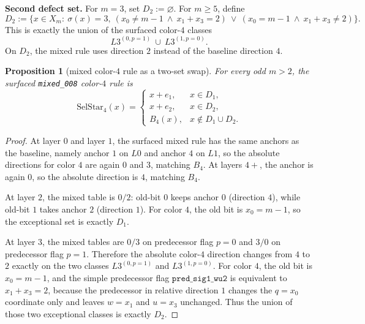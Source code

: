 \documentclass[11pt]{article}
\newtheorem{proposition}[theorem]{Proposition}
\begin{document}
\medskip
\noindent\textbf{Second defect set.}
For \(m=3\), set \(D_2:=\varnothing\).
For \(m\ge 5\), define
\[
D_2:=\bigl\{x\in X_m:\ \sigma(x)=3,\ 
(x_0\neq m-1\ \wedge\ x_1+x_3=2)\ \vee\
(x_0=m-1\ \wedge\ x_1+x_3\neq 2)\bigr\}.
\]
This is exactly the union of the surfaced color-\(4\) classes
\[
L3^{(0,p=1)}\ \cup\ L3^{(1,p=0)}.
\]
On \(D_2\), the mixed rule uses direction \(2\) instead of the baseline
direction \(4\).

\begin{proposition}[mixed color-\(4\) rule as a two-set swap]
\label{prop:mixed-color4}
For every odd \(m>2\), the surfaced \texttt{mixed\_008} color-\(4\) rule is
\[
\mathrm{SelStar}_4(x)=
\begin{cases}
x+e_1, & x\in D_1,\\
x+e_2, & x\in D_2,\\
B_4(x), & x\notin D_1\cup D_2.
\end{cases}
\]
\end{proposition}

\begin{proof}
At layer \(0\) and layer \(1\), the surfaced mixed rule has the same anchors as
the baseline, namely anchor \(1\) on \(L0\) and anchor \(4\) on \(L1\), so the
absolute directions for color \(4\) are again \(0\) and \(3\), matching \(B_4\).
At layers \(4+\), the anchor is again \(0\), so the absolute direction is \(4\),
matching \(B_4\).

At layer \(2\), the mixed table is \(0/2\): old-bit \(0\) keeps anchor \(0\)
(direction \(4\)), while old-bit \(1\) takes anchor \(2\) (direction \(1\)).
For color \(4\), the old bit is \(x_0=m-1\), so the exceptional set is exactly
\(D_1\).

At layer \(3\), the mixed tables are \(0/3\) on predecessor flag \(p=0\) and
\(3/0\) on predecessor flag \(p=1\).  Therefore the absolute color-\(4\)
direction changes from \(4\) to \(2\) exactly on the two classes
\(L3^{(0,p=1)}\) and \(L3^{(1,p=0)}\).  For color \(4\), the old bit is
\(x_0=m-1\), and the simple predecessor flag \(\texttt{pred\_sig1\_wu2}\) is
equivalent to \(x_1+x_3=2\), because the predecessor in relative direction \(1\)
changes the \(q=x_0\) coordinate only and leaves \(w=x_1\) and \(u=x_3\)
unchanged.
Thus the union of those two exceptional classes is exactly \(D_2\).
\end{proof}
\end{document}
